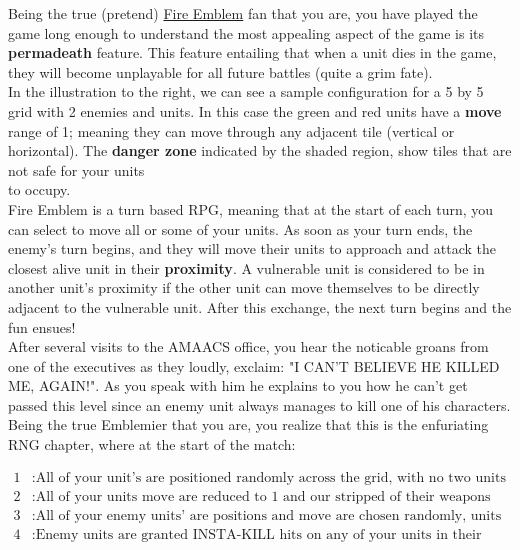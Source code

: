 

\noindent Being the true (pretend) \href{https://en.wikipedia.org/wiki/Fire_Emblem}{Fire Emblem} fan  that you are, you
have played the game long enough to understand the most appealing aspect of the game is its \textbf{permadeath} feature.
This feature entailing that when a unit dies in the game, they will become unplayable for all future battles (quite a
grim fate). \\

\noindent In the illustration to the right, we can see a sample configuration for a 5 by 5 grid with 2 enemies and
units. In this case the green and red units have a \textbf{move} range of 1; meaning they can move through any adjacent
tile (vertical or horizontal). The \textbf{danger zone} indicated by the shaded region, show tiles that are not safe for
your units \\ to occupy. \\

\noindent  Fire Emblem is a turn based RPG, meaning that at the start of each turn, you can select to move all or some
of your units. As soon as your turn ends, the enemy's turn begins, and they will move their units to approach and
attack the closest alive unit in their \textbf{proximity}.  A vulnerable unit is considered to be in another unit's
proximity if the other unit can move themselves to be directly adjacent to the vulnerable unit. After this exchange,
the next turn begins and the fun ensues!\\

\noindent After several visits to the AMAACS office, you hear the noticable groans from one of the executives as they
loudly, exclaim: "I CAN'T BELIEVE HE KILLED ME, AGAIN!". As you speak with him he explains to you how he can't get
passed this level since an enemy unit always manages to kill one of his characters.  Being the true Emblemier that you
are, you realize that this is the enfuriating RNG chapter, where at the start of the match:

\begin{align*}
1 &: \text{All of your unit's are positioned randomly across the grid, with no two units being adjacent.}\\
2 &: \text{All of your units move are reduced to 1 and our stripped of their weapons for the duration of this turn.} \\
3 &: \text{All of your enemy units' are positions and move are chosen randomly, units may be adjacent with your own} \\
4 &: \text{Enemy units are granted INSTA-KILL hits on any of your units in their proximity}
\end{align*}

